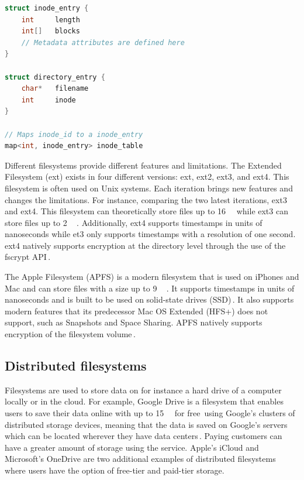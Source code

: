 \begin{minipage}{\linewidth}
\begin{lstlisting}[language=c, caption={Pseudocode of a minimalistic inode filesystem structure}, label=lst:inode_fs]
struct inode_entry {
	int 	length
	int[]	blocks
	// Metadata attributes are defined here
}

struct directory_entry {
	char*   filename
	int     inode
}

// Maps inode_id to a inode_entry
map<int, inode_entry> inode_table

\end{lstlisting}
\end{minipage}

Different filesystems provide different features and limitations. The Extended Filesystem (ext) exists in four different versions: ext, ext2, ext3, and ext4. This filesystem is often used on Unix systems. Each iteration brings new features and changes the limitations. For instance, comparing the two latest iterations, ext3 and ext4. This filesystem can theoretically store files up to \SI{16}{\tebi\byte} while ext3 can store files up to \SI{2}{\tebi\byte}\,\cite{salterUnderstandingLinuxFilesystems2018}. Additionally, ext4 supports timestamps in units of nanoseconds while et3 only supports timestamps with a resolution of one second. ext4 natively supports encryption at the directory level through the use of the fscrypt API\,\cite{FscryptArchWiki}.

The Apple Filesystem (APFS) is a modern filesystem that is used on iPhones and Mac and can store files with a size up to \SI{9}{\exa\byte}\,\cite{APFSAppleFile2017}. It supports timestamps in units of nanoseconds and is built to be used on solid-state drives (SSD)\,\cite{nelsonWhatAPFSDoes}. It also supports modern features that its predecessor Mac OS Extended (HFS+) does not support, such as Snapshots and Space Sharing. APFS natively supports encryption of the filesystem volume\,\cite{appleinc.FileSystemFormats}.

\subsection{Distributed filesystems}
Filesystems are used to store data on for instance a hard drive of a computer locally or in the cloud. For example, Google Drive is a filesystem that enables users to save their data online with up to \SI{15}{\giga\byte} for free\,\cite{CloudStorageWork} using Google's clusters of distributed storage devices, meaning that the data is saved on Google's servers which can be located wherever they have data centers\,\cite{DistributedStorageWhat}. Paying customers can have a greater amount of storage using the service. Apple's iCloud and Microsoft's OneDrive are two additional examples of distributed filesystems where users have the option of free-tier and paid-tier storage.

